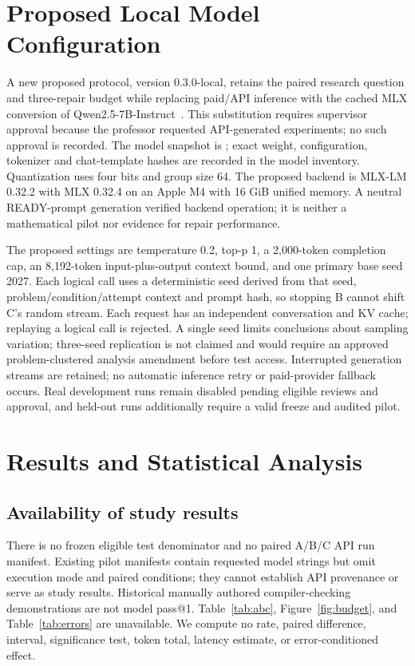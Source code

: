\documentclass[runningheads,a4paper]{llncs}
\begin{document}
\section{Proposed Local Model Configuration}
A new proposed protocol, version 0.3.0-local, retains the paired research
question and three-repair budget while replacing paid/API inference with the
cached MLX conversion of Qwen2.5-7B-Instruct~\cite{qwenmlx,mlxlm}.
This substitution requires supervisor approval because the professor requested
API-generated experiments; no such approval is recorded. The model snapshot
is ; exact weight,
configuration, tokenizer and chat-template hashes are recorded in the model
inventory. Quantization uses four bits and group size 64. The proposed backend
is MLX-LM 0.32.2 with MLX 0.32.4 on an Apple M4 with 16 GiB unified memory.
A neutral READY-prompt generation verified backend operation; it is neither a
mathematical pilot nor evidence for repair performance.

The proposed settings are temperature 0.2, top-p 1, a 2,000-token completion
cap, an 8,192-token input-plus-output context bound, and one primary base seed
2027. Each logical call uses a deterministic seed derived from that seed,
problem/condition/attempt context and prompt hash, so stopping B cannot shift
C's random stream. Each request has an independent conversation and KV cache;
replaying a logical call is rejected. A single seed limits conclusions about
sampling variation; three-seed replication is not claimed and would require
an approved problem-clustered analysis amendment before test access.
Interrupted generation streams are retained; no automatic inference retry or
paid-provider fallback occurs. Real development runs remain disabled pending
eligible reviews and approval, and held-out runs additionally require a valid
freeze and audited pilot.

\section{Results and Statistical Analysis}
\subsection{Availability of study results}
There is no frozen eligible test denominator and no paired A/B/C API run
manifest. Existing pilot manifests contain requested model strings but omit
execution mode and paired conditions; they cannot establish API provenance or
serve as study results. Historical manually authored compiler-checking
demonstrations are not model pass@1. Table~\ref{tab:abc},
Figure~\ref{fig:budget}, and Table~\ref{tab:errors} are unavailable. We
compute no rate, paired difference, interval, significance test, token total,
latency estimate, or error-conditioned effect.
\end{document}
